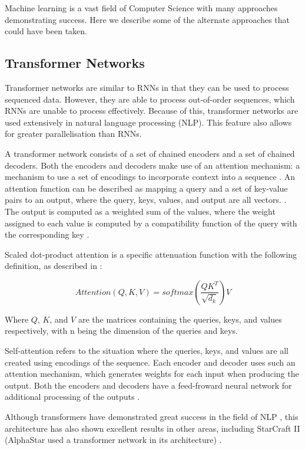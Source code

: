 Machine learning is a vast field of Computer Science with many approaches demonstrating success. Here we describe some of the alternate approaches that could have been taken.

\subsection{Transformer Networks}

Transformer networks are similar to RNNs in that they can be used to process sequenced data. However, they are able to process out-of-order sequences, which RNNs are unable to process effectively. Because of this, transformer networks are used extensively in natural language processing (NLP). This feature also allows for greater parallelisation than RNNs.

A transformer network consists of a set of chained encoders and a set of chained decoders. Both the encoders and decoders make use of an attention mechanism: a mechanism to use a set of encodings to incorporate context into a sequence \cite{illustratedtransformer}. An attention function can be described as mapping a query and a set of key-value pairs to an output, where the query, keys, values, and output are all vectors. \cite{attention}. The output is computed as a weighted sum of the values, where the weight assigned to each value is computed by a compatibility function of the query with the corresponding key \cite{attention}.

Scaled dot-product attention is a specific attenuation function with the following definition, as described in \cite{attention}:

\[
Attention(Q,K,V)=softmax(\frac{QK^T}{\sqrt{d_k}})V
\]

Where $Q$, $K$, and $V$ are the matrices containing the queries, keys, and values respectively, with n being the dimension of the queries and keys.

Self-attention refers to the situation where the queries, keys, and values are all created using encodings of the sequence. Each encoder and decoder uses such an attention mechanism, which generates weights for each input when producing the output. Both the encoders and decoders have a feed-froward neural network for additional processing of the outputs \cite{illustratedtransformer}.

Although transformers have demonstrated great success in the field of NLP \cite{attention}, this architecture has also shown excellent results in other areas, including StarCraft II (AlphaStar used a transformer network in its architecture) \cite{alphastar}.

